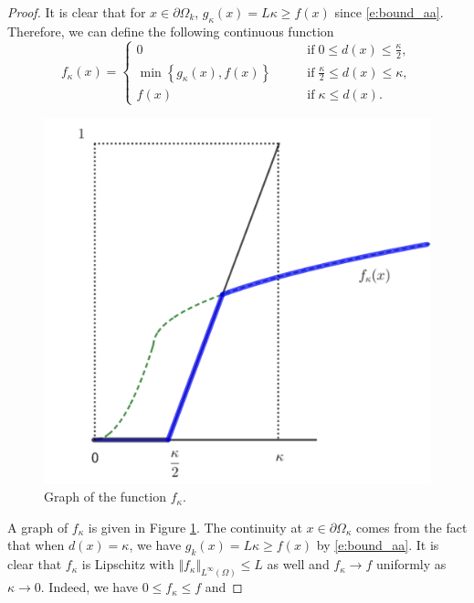\documentclass[11pt,reqno]{amsart}
\numberwithin{figure}{section}
\theoremstyle{plain}
\theoremstyle{remark}
\numberwithin{equation}{section}
\begin{document}
\begin{proof}
\noindent
It is clear that for $x\in \partial\Omega_k$, $g_\kappa(x) = L\kappa \geq f(x)$ since \eqref{e:bound_aa}. Therefore, we can define the following continuous function
\begin{equation*}
    f_\kappa(x) = 
    \begin{cases}
        0             &\qquad\text{if}\;0\leq d(x) \leq \frac{\kappa}{2},\\
        \min \left\lbrace g_\kappa(x), f(x) \right\rbrace &\qquad\text{if}\;\frac{\kappa}{2}\leq d(x) \leq \kappa,\\
        f(x) &\qquad\text{if}\;\kappa \leq d(x).
    \end{cases}
\end{equation*}
\begin{figure}[h]
    \centering
    \includegraphics[scale=0.35]{Drafts and notes/fig1.png}
    \caption{Graph of the function $f_\kappa$.}
    \label{fig:f_kappa}
\end{figure}
A graph of $f_\kappa$ is given in Figure \ref{fig:f_kappa}. The continuity at $x\in \partial\Omega_\kappa$ comes from the fact that when $d(x) =\kappa$, we have $g_k(x) = L\kappa \geq f(x)$ by \eqref{e:bound_aa}. It is clear that $f_\kappa$ is Lipschitz with $\Vert f_\kappa\Vert_{L^\infty(\Omega)}\leq L$ as well and $f_\kappa\to f$ uniformly as $\kappa\to 0$. Indeed, we have $0\leq f_\kappa \leq f$ and

\end{proof}
\end{document}
